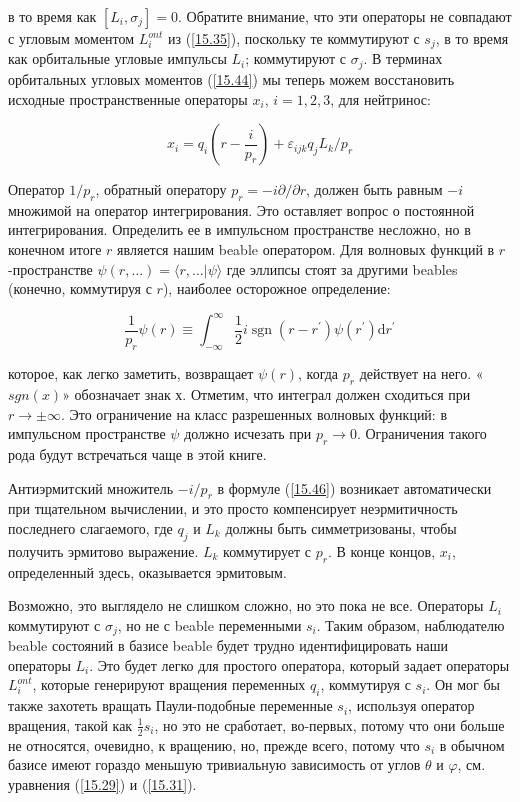 \documentclass[main.tex]{subfiles}
\begin{document}
в то время как $[L_i, \sigma_j] = 0$. Обратите внимание, что эти операторы не совпадают с угловым моментом $L_i^{ont}$ из (\ref{15.35}), поскольку те коммутируют с $s_j$, в то время как орбитальные угловые импульсы $L_i$; коммутируют с $\sigma_j$. В терминах орбитальных угловых моментов (\ref{15.44}) мы теперь можем восстановить исходные пространственные операторы $x_i$, $i = 1,2,3$, для нейтринос:

\begin{equation}\label{15.46}
	x_{i}=q_{i}\left(r-\frac{i}{p_{r}}\right)+\varepsilon_{i j k} q_{j} L_{k} / p_{r}
\end{equation}

Оператор $1 / p_r$, обратный оператору $ p_r = -i\partial / \partial r$, должен быть равным $-i$ множимой на оператор интегрирования. Это оставляет вопрос о постоянной интегрирования. Определить ее в импульсном пространстве несложно, но в конечном итоге $r$ является нашим beable оператором. Для волновых функций в $r$-пространстве $\psi(r,\ldots) = \langle r, \ldots |\psi\rangle$ где эллипсы стоят за другими beables (конечно, коммутируя с $r$), наиболее осторожное определение:

\begin{equation}\label{15.47}
	\frac{1}{p_{r}} \psi(r) \equiv \int_{-\infty}^{\infty} \frac{1}{2} i \operatorname{sgn}\left(r-r^{\prime}\right) \psi\left(r^{\prime}\right) \mathrm{d} r^{\prime}
\end{equation}

которое, как легко заметить, возвращает $\psi(r)$, когда $p_r$ действует на него. «$sgn(x)$» обозначает знак $х$. Отметим, что интеграл должен сходиться при $r\rightarrow \pm \infty$. Это ограничение на класс разрешенных волновых функций: в импульсном пространстве $\psi$ должно исчезать при $p_r\rightarrow 0$. Ограничения такого рода будут встречаться чаще в этой книге.

Антиэрмитский множитель $-i/p_r$ в формуле (\ref{15.46}) возникает автоматически при тщательном вычислении, и это просто компенсирует неэрмитичность последнего слагаемого, где $q_j$ и $L_k$ должны быть симметризованы, чтобы получить эрмитово выражение. $L_k$ коммутирует с $p_r$. В конце концов, $x_i$, определенный здесь, оказывается эрмитовым.

Возможно, это выглядело не слишком сложно, но это пока не все. Операторы $L_i$ коммутируют с $\sigma_j$, но не с beable переменными $s_i$. Таким образом, наблюдателю beable состояний в базисе beable будет трудно идентифицировать наши операторы $L_i$. Это будет легко для простого оператора, который задает операторы $L_i^{ont}$, которые генерируют вращения переменных $q_i$, коммутируя с $s_i$. Он мог бы также захотеть вращать Паули-подобные переменные $s_i$, используя оператор вращения, такой как $\frac 1 2 s_i$, но это не сработает, во-первых, потому что они больше не относятся, очевидно, к вращению, но, прежде всего, потому что $s_i$ в обычном базисе имеют гораздо меньшую тривиальную зависимость от углов $\theta$ и $\varphi$, см. уравнения (\ref{15.29}) и (\ref{15.31}).
\end{document}
